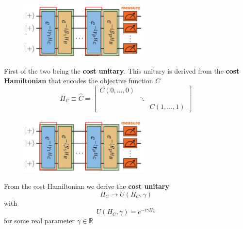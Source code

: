 \documentclass{beamer}
\begin{document}
{\begin{frame}[t]
	\begin{figure}[t]
		\includegraphics[width=0.6\textwidth]{figures/qaoa_idea_edit_2}
	\end{figure}
\vspace{20px}
	First of the two being the \textbf{cost unitary}. This unitary is derived from the \textbf{cost Hamiltonian} that encodes the objective function $C$
	\begin{equation}
	H_C \equiv \hat{C} = \begin{bmatrix}
	C(0,\dots,0) & &  \\
	& \ddots & \\
	& & C(1,\dots,1)
	\end{bmatrix}
	\end{equation}
\end{frame}

\begin{frame}[t]
\begin{figure}[t]
	\includegraphics[width=0.6\textwidth]{figures/qaoa_idea_edit_2}
\end{figure}
\vspace{20px}
From the cost Hamiltonian we derive the \textbf{cost unitary}
\begin{equation}
H_C \longrightarrow U(H_C,\gamma)
\end{equation}
with 
\begin{equation}
	U(H_C,\gamma) = e^{-i\gamma H_C}
\end{equation}
for some real parameter $\gamma \in \mathbb{R}$

\end{frame}


}
\end{document}
